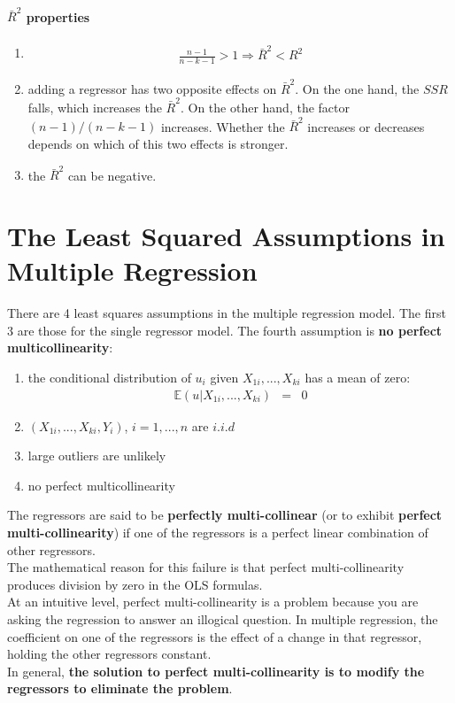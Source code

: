 \paragraph{$\bar{R}^{2}$ properties}
\begin{enumerate}
	\item
	\begin{eqnarray}
	 \frac{n - 1}{n - k - 1} > 1 \Rightarrow \bar{R}^{2} < R^{2}
	\end{eqnarray}
	\item adding a regressor has two opposite effects on $\bar{R}^{2}$. On the one hand, the $SSR$ falls, which increases the $\bar{R}^{2}$. On the other hand, the factor $\left(n - 1\right) / \left(n - k - 1\right)$ increases. Whether the $\bar{R}^{2}$ increases or decreases depends on which of this two effects is stronger.
	\item the $\bar{R}^{2}$ can be negative.
\end{enumerate}

\section{The Least Squared Assumptions in Multiple Regression}
There are 4 least squares assumptions in the multiple regression model. The first 3 are those for the single regressor model. The fourth assumption is \textbf{no perfect multicollinearity}:
\begin{enumerate}
	\item the conditional distribution of $u_{i}$ given $X_{1i}, ..., X_{ki}$ has a mean of zero:
	\begin{eqnarray}
	\mathbb{E}\left(u\vert X_{1i}, ..., X_{ki}\right) &=& 0
	\end{eqnarray}
	\item $\left(X_{1i}, ..., X_{ki}, Y_{i}\right)$, $i = 1, ..., n$ are $i.i.d$
	\item large outliers are unlikely
	\item no perfect multicollinearity
\end{enumerate}
The regressors are said to be \textbf{\color{blue}perfectly multi-collinear} (or to exhibit \textbf{\color{blue}perfect multi-collinearity}) if one of the regressors is a perfect linear combination of other regressors.\\
The mathematical reason for this failure is that perfect multi-collinearity produces division by zero in the OLS formulas.\\
At an intuitive level, perfect multi-collinearity is a problem because you are asking the regression to answer an illogical question. In multiple regression, the coefficient on one of the regressors is the effect of a change in that regressor, holding the other regressors constant.\\
In general, \textbf{\color{blue}the solution to perfect multi-collinearity is to modify the regressors to eliminate the problem}.

